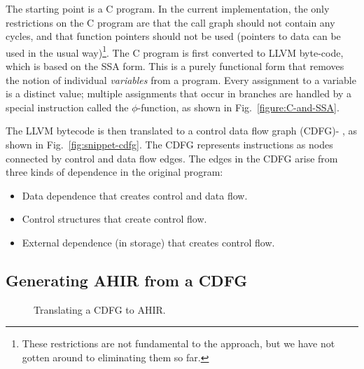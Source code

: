 \documentclass[conference]{IEEEtran}
\begin{document}
The starting point is a C program.  In the current implementation,
the only restrictions on the C program are that the call graph
should not contain any cycles, and that function pointers should
not be used (pointers to data can be used in the usual way)\footnote{These restrictions
are not fundamental to the approach, but we have not gotten around to eliminating
them so far.}.
The C program is first converted to LLVM byte-code, which is based on
the SSA form\cite{muchnick}. This is a purely functional form that
removes the notion of individual {\it variables} from a program. Every
assignment to a variable is a distinct value; multiple assignments
that occur in branches are handled by a special instruction called the
$\phi$-function, as shown in Fig.~\ref{figure:C-and-SSA}.

\nocite{conditional_branches_rim_jain_1992}
\nocite{DFG_jong_1991}
\nocite{DFG_standard_eijndhoven_1992}
\nocite{flow_graph_orailoglu_1986}
\nocite{functional_synthesis_TASS_amellal_kaminska_1994}

The LLVM bytecode is then translated to a control data flow graph
(CDFG)\cite{conditional_branches_rim_jain_1992}-%
\cite{functional_synthesis_TASS_amellal_kaminska_1994}, as shown in
Fig.~\ref{fig:snippet-cdfg}. The CDFG represents instructions as
nodes connected by control and data flow edges. The edges in the CDFG
arise from three kinds of dependence in the original program:

\begin{itemize}
\item Data dependence that creates control and data flow.
\item Control structures that create control flow.
\item External dependence (in storage) that creates control flow.
\end{itemize}

\subsection{Generating AHIR from a CDFG}

\begin{figure*}
\centering
{}%
\hspace{0.25in}%
%
\hspace{0.25in}%
%
\caption{Translating a CDFG to AHIR.}%
\label{figure:cdfg-to-ahir}%
\end{figure*}
\end{document}
